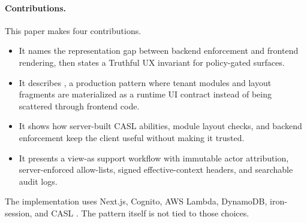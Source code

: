 \paragraph{Contributions.}
This paper makes four contributions.

\begin{itemize}
  \item It names the representation gap between backend enforcement and frontend rendering, then states a Truthful UX invariant for policy-gated surfaces.
  \item It describes \uiData{}, a production pattern where tenant modules and layout fragments are materialized as a runtime UI contract instead of being scattered through frontend code.
  \item It shows how server-built CASL abilities, module layout checks, and backend enforcement keep the client useful without making it trusted.
  \item It presents a view-as support workflow with immutable actor attribution, server-enforced allow-lists, signed effective-context headers, and searchable audit logs.
\end{itemize}

The implementation uses Next.js, Cognito, AWS Lambda, DynamoDB, iron-session, and CASL \cite{aws_cognito_user_pools,aws_cognito_groups,aws_lambda,aws_dynamodb,iron_session,casl_docs}. The pattern itself is not tied to those choices.
